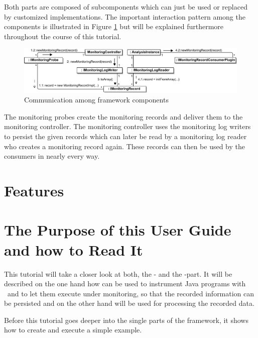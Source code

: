 \noindent Both parts are composed of subcomponents which can just be used or %
replaced by customized implementations. The important interaction pattern among %
the components is illustrated in Figure \ref{Figure:KiekerCommunicationDiagram} %
but will be explained furthermore throughout the course of this tutorial. %

\begin{figure}[H]\centering
\includegraphics[width=1\textwidth]{images/kiekerCommunications-revisedReArranged-woMonitoringLog-bw-newNames}
\caption{Communication among \Kieker{} framework components}
\label{Figure:KiekerCommunicationDiagram}
\end{figure}
		
\noindent The monitoring probes create the monitoring records and deliver %
them to the monitoring controller. The monitoring controller uses the monitoring %
log writers to persist the given records which can later be read by a monitoring %
log reader who creates a monitoring record again. These records can then be used %
by the consumers in nearly every way.

\section{Features}
	
\section{The Purpose of this User Guide and how to Read It}
This tutorial will take a closer look at both, the \KiekerMonitoringPart{}- and %
the \KiekerAnalysisPart-part. It will be described on the one hand how %
\KiekerMonitoringPart{}  can be used to instrument Java programs %
with \Kieker\ and to let them execute under monitoring, so that the recorded %
information can be persisted and on the other hand \KiekerAnalysisPart{} %
will be used for processing the recorded data.

Before this tutorial goes deeper into the single parts of the framework, it %
shows how to create and execute a simple example.


